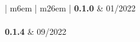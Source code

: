



\begin{center}
\begin{tabular}{| m{6em} | m{26em} |}\hline
    \textbf{0.1.0} & 01/2022\\ \hline
    \\ \hline
    \textbf{0.1.4} & 09/2022\\ \hline
    \\ \hline
\end{tabular}
\end{center}
